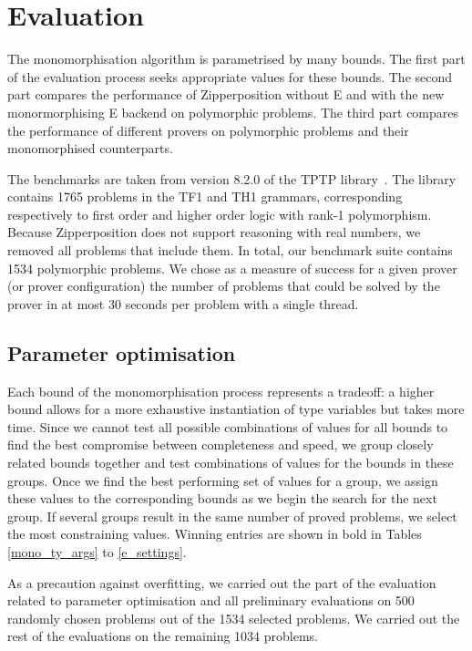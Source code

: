 \documentclass[runningheads]{llncs}
\begin{document}
\section{Evaluation}
\label{sec:evaluation}

The monomorphisation algorithm is parametrised by many bounds. The first part of the evaluation process seeks appropriate values for these bounds. The second part compares the performance of Zipperposition without E and with the new monormorphising E backend on polymorphic problems. The third part compares the performance of different provers on polymorphic problems and their monomorphised counterparts.

The benchmarks are taken from version 8.2.0 of the TPTP library~\cite{tptp}. The library contains 1765 problems in the TF1 and TH1 grammars, corresponding respectively to first order and higher order logic with rank-1 polymorphism. Because Zipperposition does not support reasoning with real numbers, we removed all problems that include them. In total, our benchmark suite contains 1534 polymorphic problems. We chose as a measure of success for a given prover (or prover configuration) the number of problems
that could be solved by the prover in at most 30 seconds
per problem with a single thread.



\subsection{Parameter optimisation}
\label{param_opti}

Each bound of the monomorphisation process represents a tradeoff: a higher bound allows for a more exhaustive instantiation of type variables but takes more time. Since we cannot test all possible combinations of values for all bounds to find the best compromise between completeness and speed,
we group closely related bounds together and test combinations of values for the bounds in these groups. Once we find the best performing set of values for a group, we assign these values to the corresponding bounds as we begin the search for the next group. If several groups result in the same number of proved problems, we select the most constraining values. Winning entries are shown in bold in Tables \ref{mono_ty_args} to \ref{e_settings}.

As a precaution against overfitting, we carried out the part of the evaluation related to parameter optimisation and all preliminary evaluations on 500 randomly chosen problems out of the 1534 selected problems. We carried out the rest of the evaluations on the remaining 1034 problems.
\end{document}
